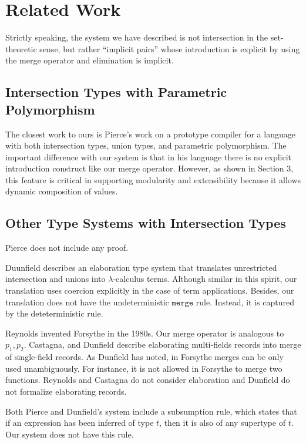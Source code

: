 \section{Related Work}

Strictly speaking, the system we have described is not intersection in the
set-theoretic sense, but rather ``implicit pairs'' whose introduction is
explicit by using the merge operator and elimination is implicit.

\subsection{Intersection Types with Parametric Polymorphism}

The closest work to ours is Pierce's work on a prototype compiler for a language
with both intersection types, union types, and parametric polymorphism. The
important difference with our system is that in his language there is no
explicit introduction construct like our merge operator. However, as shown in
Section 3, this feature is critical in supporting modularity and extensibility
because it allows dynamic composition of values.

\subsection{Other Type Systems with Intersection Types}

Pierce does not include any proof.


Duunfield describes an elaboration type system that translates unrestricted
intersection and unions into $\lambda$-calculus terms. Although similar in this
spirit, our translation uses coercion explicitly in the case of term
applications. Besides, our translation does not have the undeterministic
$ \texttt{merge} $ rule. Instead, it is captured by the deteterministic
 rule.

Reynolds invented Forsythe in the 1980s. Our merge operator is analogous to
$ p_1, p_2 $. Castagna, and Dunfield describe elaborating multi-fields records
into merge of single-field records. As Dunfield has noted, in Forsythe merges
can be only used unambiguously. For instance, it is not allowed in Forsythe to
merge two functions. Reynolds and Castagna do not consider elaboration and
Dunfield do not formalize elaborating records.

Both Pierce and Dunfield's system include a subsumption rule, which states that
if an expression has been inferred of type $ t $, then it is also of any
supertype of $ t $. Our system does not have this rule.

